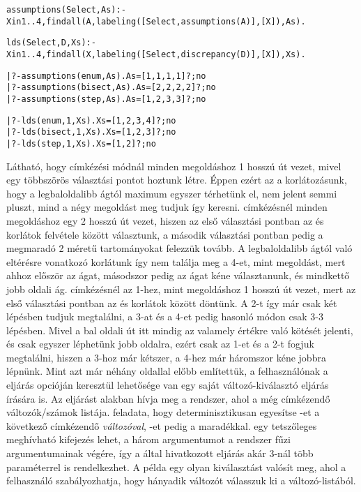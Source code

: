 \begin{alltt}
% a Select címkézési mód használatával megkeresi az X in 1..4 korlát összes
% megoldását, és a megoldásokhoz vezető utak hosszát As-ben adja vissza
assumptions(Select, As) :-
     X in 1..4, findall(A, labeling([Select, assumptions(A)], [X]), As).

% a Select címkézési mód és D eltérés-korlát használatával megkeresi az
% X in 1..4 korlát összes megoldását, és a megtalált megoldásokat visszaadja
% Xs-ben
lds(Select, D, Xs) :-
     X in 1..4, findall(X, labeling([Select, discrepancy(D)], [X]), Xs).

| ?- assumptions(enum, As).          As = [1,1,1,1] ? ; no
| ?- assumptions(bisect, As).        As = [2,2,2,2] ? ; no
| ?- assumptions(step, As).          As = [1,2,3,3] ? ; no 
                                                                          
| ?- lds(enum, 1, Xs).               Xs = [1,2,3,4] ? ; no 
| ?- lds(bisect, 1, Xs).             Xs = [1,2,3] ? ; no 
| ?- lds(step, 1, Xs).               Xs = [1,2] ? ; no 
\end{alltt}

Látható, hogy  címkézési módnál minden megoldáshoz 1 hosszú út vezet,
mivel egy többszörös választási pontot hoztunk létre. Éppen ezért az a korlátozásunk,
hogy a legbaloldalibb ágtól maximum egyszer térhetünk el, nem jelent semmi pluszt,
mind a négy megoldást meg tudjuk így keresni.
\br
{} címkézésnél minden megoldáshoz egy 2 hosszú út vezet, hiszen az
első választási pontban az  és  korlátok felvétele között
választunk, a második választási pontban pedig a megmaradó 2 méretű tartományokat
felezzük tovább. A legbaloldalibb ágtól való eltérésre vonatkozó korlátunk így nem
találja meg a 4-et, mint megoldást, mert ahhoz először az  ágat, másodszor
pedig az  ágat kéne választanunk, és mindkettő jobb oldali ág.
\br
{} címkézésnél az 1-hez, mint megoldáshoz 1 hosszú út vezet, mert az első
választási pontban az  és  korlátok között döntünk. A 2-t így
már csak két lépésben tudjuk megtalálni, a 3-at és a 4-et pedig hasonló módon csak
3-3 lépésben. Mivel a bal oldali út itt mindig az  valamely értékre való kötését
jelenti, és csak egyszer léphetünk jobb oldalra, ezért csak az 1-et és a 2-t fogjuk
megtalálni, hiszen a 3-hoz már kétszer, a 4-hez már háromszor kéne jobbra lépnünk.
\br
\label{variable:sel}
Mint azt már néhány oldallal előbb említettük, a felhasználónak a 
eljárás  opcióján keresztül lehetősége van egy saját változó-kiválasztó
eljárás írására is. Az eljárást  alakban hívja meg a rendszer,
ahol  a még címkézendő változók/számok listája.  feladata, hogy
determinisztikusan egyesítse -et a következő címkézendő \emph{változóval},
-et pedig a maradékkal.  egy tetszőleges meghívható kifejezés lehet,
a három argumentumot a rendszer fűzi  argumentumainak végére, így a 
által hivatkozott eljárás akár 3-nál több paraméterrel is rendelkezhet. A példa egy olyan
kiválasztást valósít meg, ahol a felhasználó szabályozhatja, hogy hányadik változót
válasszuk ki a változó-listából.

